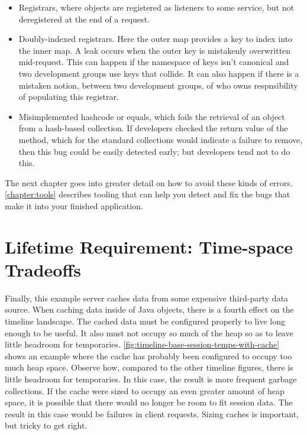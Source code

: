 \begin{itemize}
  \item Registrars, where objects are registered as listeners to some service,
  but not deregistered at the end of a request.
  \item Doubly-indexed registrars. Here the outer map provides a key to index
  into the inner map. A leak occurs when the outer key is mistakenly
  overwritten mid-request. This can happen if the namespace of keys isn't
  canonical and two development groups use keys that collide. It can also
  happen if there is a mistaken notion, between two development groups, of who
  owns respnsibility of populating this registrar.
  \item Misimplemented hashcode or equals, which foils the retrieval of an
  object from a hash-based collection. If developers checked the return value of
  the  method, which for the standard collections would indicate a failure to remove, then
  this bug could be easily detected early; but developers tend not to do this.
\end{itemize}

The next chapter goes into greater detail on how to avoid these kinds of
errors. \autoref{chapter:tools} describes tooling that can help you
detect and fix the bugs that make it into your finished application.

\section{Lifetime Requirement: Time-space Tradeoffs}
Finally, this example server caches data from some expensive third-party data
source. When caching data inside of Java objects, there is a fourth effect on
the timeline landscape. The
cached data must be configured properly to live long enough to be useful. It
also must not occupy so much of the heap so as to leave little headroom for
temporaries. \autoref{fig:timeline-base-session-temps-with-cache} shows an
example where the cache has probably been configured to occupy too much heap
space. Observe how, compared to the other timeline figures, there is little
headroom for temporaries. In this case, the result is more frequent garbage
collections. If the cache were sized to occupy an even greater amount of heap
space, it is possible that there would no longer be room to fit session data.
The result in this case would be failures in client requests. 
Sizing caches is important, but tricky to get right.

